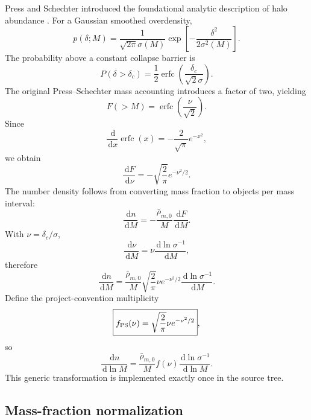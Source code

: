 \documentclass[11pt]{article}
\newcommand{\dd}{\,\mathrm d}
\newcommand{\rhobar}{\bar{\rho}_{m,0}}
\begin{document}
Press and Schechter introduced the foundational analytic description of halo abundance \cite{PressSchechter1974}. For a Gaussian smoothed overdensity,
\begin{equation}
p(\delta;M)=\frac{1}{\sqrt{2\pi}\sigma(M)}
\exp\left[-\frac{\delta^2}{2\sigma^2(M)}\right].
\end{equation}
The probability above a constant collapse barrier is
\begin{equation}
P(\delta>\delta_c)=\frac{1}{2}\operatorname{erfc}\left(\frac{\delta_c}{\sqrt{2}\sigma}\right).
\end{equation}
The original Press--Schechter mass accounting introduces a factor of two, yielding
\begin{equation}
F(>M)=\operatorname{erfc}\left(\frac{\nu}{\sqrt2}\right).
\end{equation}
Since
\begin{equation}
\frac{\dd}{\dd x}\operatorname{erfc}(x)=-\frac{2}{\sqrt\pi}e^{-x^2},
\end{equation}
we obtain
\begin{equation}
\frac{\dd F}{\dd\nu}=-\sqrt{\frac{2}{\pi}}e^{-\nu^2/2}.
\end{equation}
The number density follows from converting mass fraction to objects per mass interval:
\begin{equation}
\frac{\dd n}{\dd M}=-\frac{\rhobar}{M}\frac{\dd F}{\dd M}.
\end{equation}
With $\nu=\delta_c/\sigma$,
\begin{equation}
\frac{\dd\nu}{\dd M}=\nu\frac{\dd\ln\sigma^{-1}}{\dd M},
\end{equation}
therefore
\begin{equation}
\boxed{
\frac{\dd n}{\dd M}=\frac{\rhobar}{M}
\sqrt{\frac{2}{\pi}}\nu e^{-\nu^2/2}
\frac{\dd\ln\sigma^{-1}}{\dd M}.
}
\end{equation}
Define the project-convention multiplicity
\begin{equation}
\boxed{f_{\rm PS}(\nu)=\sqrt{\frac{2}{\pi}}\nu e^{-\nu^2/2}},
\end{equation}
so
\begin{equation}
\boxed{
\frac{\dd n}{\dd\ln M}=\frac{\rhobar}{M}f(\nu)
\frac{\dd\ln\sigma^{-1}}{\dd\ln M}.
}
\end{equation}
This generic transformation is implemented exactly once in the source tree.

\subsection{Mass-fraction normalization}
\end{document}
